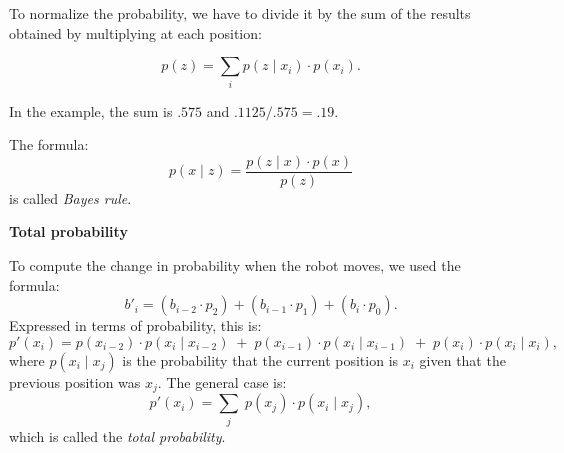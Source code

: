 To normalize the probability, we have to divide it by the sum of the
results obtained by multiplying at each position:

\begin{displaymath}
p(z) = \sum_i p(z\mid x_i)\cdot p(x_i).
\end{displaymath}

In the example, the sum is $.575$ and $.1125/.575=.19$.

The formula:
\begin{displaymath}
p(x\mid z) = \frac{p(z\mid x)\cdot p(x)}{p(z)}
\end{displaymath}
is called \emph{Bayes rule}.


\textbf{Total probability}

To compute the change in probability when the robot moves, we used
the formula:
\begin{displaymath}
b'_i = (b_{i-2}\cdot p_2) + (b_{i-1}\cdot p_1) + (b_{i} \cdot p_0).
\end{displaymath}
Expressed in terms of probability, this is:
\begin{displaymath}
p'(x_i) = p(x_{i-2})\cdot p(x_i\mid x_{i-2}) \; + \;
p(x_{i-1})\cdot p(x_i\mid x_{i-1}) \; + \; p(x_{i})\cdot p(x_i\mid x_{i}),
\end{displaymath}
where $p(x_i\mid x_j)$ is the probability that the current position is
$x_i$ given that the previous position was $x_j$. The general case is:
\begin{displaymath}
p'(x_i) = \sum_j \;p(x_j)\cdot p(x_i\mid x_j),
\end{displaymath}
which is called the \emph{total probability}.
